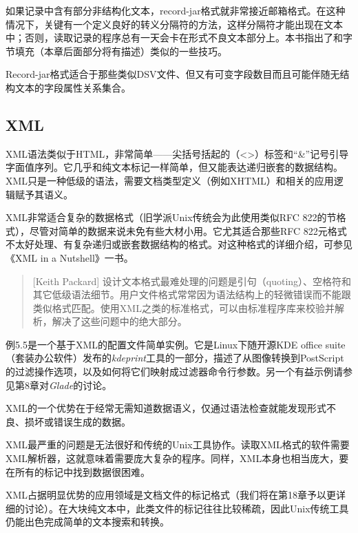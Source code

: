 \documentclass[12pt,oneside]{book}
\begin{document}
如果记录中含有部分非结构化文本，record-jar格式就非常接近邮箱格式。在这种情况下，关键有一个定义良好的转义分隔符的方法，这样分隔符才能出现在文本中；否则，读取记录的程序总有一天会卡在形式不良文本部分上。本书指出了和字节填充（本章后面部分将有描述）类似的一些技巧。

Record-jar格式适合于那些类似DSV文件、但又有可变字段数目而且可能伴随无结构文本的字段属性关系集合。
 
\subsection{ XML}
XML语法类似于HTML，非常简单——尖括号括起的（<>）标签和“\&{}”记号引导字面值序列。它几乎和纯文本标记一样简单，但又能表达递归嵌套的数据结构。XML只是一种低级的语法，需要文档类型定义（例如XHTML）和相关的应用逻辑赋予其语义。

XML非常适合复杂的数据格式（旧学派Unix传统会为此使用类似RFC 822的节格式），尽管对简单的数据来说未免有些大材小用。它尤其适合那些RFC 822元格式不太好处理、有复杂递归或嵌套数据结构的格式。对这种格式的详细介绍，可参见《XML in a Nutshell》一书\cite{Harold-Means}。
\begin{quote}[Keith Packard]
设计文本格式最难处理的问题是引句（quoting）、空格符和其它低级语法细节。用户文件格式常常因为语法结构上的轻微错误而不能跟类似格式匹配。使用XML之类的标准格式，可以由标准程序库来校验并解析，解决了这些问题中的绝大部分。
\end{quote}

例5.5是一个基于XML的配置文件简单实例。它是Linux下随开源KDE office suite（套装办公软件）发布的\textit{kdeprint}工具的一部分，描述了从图像转换到PostScript的过滤操作选项，以及如何将它们映射成过滤器命令行参数。另一个有益示例请参见第8章对\textit{Glade}的讨论。

XML的一个优势在于经常无需知道数据语义，仅通过语法检查就能发现形式不良、损坏或错误生成的数据。

XML最严重的问题是无法很好和传统的Unix工具协作。读取XML格式的软件需要XML解析器，这就意味着需要庞大复杂的程序。同样，XML本身也相当庞大，要在所有的标记中找到数据很困难。

XML占据明显优势的应用领域是文档文件的标记格式（我们将在第18章予以更详细的讨论）。在大块纯文本中，此类文件的标记往往比较稀疏，因此Unix传统工具仍能出色完成简单的文本搜索和转换。
\end{document}
